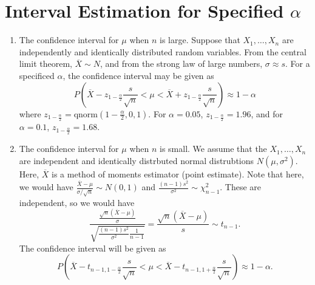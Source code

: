 \documentclass[15pt,a4paper]{book}
\theoremstyle{definition}
\begin{document}
\section{Interval Estimation for Specified $\alpha$}
\begin{enumerate}
    \item The confidence interval for $\mu$ when $n$ is large. Suppose that $X_{1},\ldots,X_{n}$ are independently and identically distributed random variables. From the central limit theorem, $\overline{X} \sim N$, and from the strong law of large numbers, $\sigma \approx s$. For a specificed $\alpha$, the confidence interval may be given as
    \begin{equation}
        P(\overline{X}-z_{1-\frac{\alpha}{2}} \frac{s}{\sqrt{n}} < \mu < \overline{X}+z_{1-\frac{\alpha}{2}} \frac{s}{\sqrt{n}}) \approx 1-\alpha
    \end{equation}
    where $z_{1-\frac{\alpha}{2}} = \text{qnorm}(1-\frac{\alpha}{2}, 0, 1)$. For $\alpha = 0.05$, $z_{1-\frac{\alpha}{2}} = 1.96$, and for $\alpha = 0.1$, $z_{1-\frac{\alpha}{2}} = 1.68$.
    
    \item The confidence interval for $\mu$ when $n$ is small. We assume that the $X_{1},\ldots,X_{n}$ are independent and identically distrbuted normal distrubtions $N(\mu,\sigma^{2})$. Here, $\overline{X}$ is a method of moments estimator (point estimate). Note that here, we would have $\frac{\overline{X}-\mu}{\sigma/\sqrt{n}} \sim N(0,1)$ and $\frac{(n-1)s^{2}}{\sigma^{2}} \sim \chi_{n-1}^{2}$. These are independent, so we would have
    \begin{equation}
        \dfrac{\frac{\sqrt{n} (\overline{X}-\mu)}{\sigma}}{\sqrt{\frac{(n-1)s^{2}}{\sigma^{2}} \frac{1}{n-1}}} = \frac{\sqrt{n}(\overline{X}-\mu)}{s} \sim t_{n-1}.
    \end{equation}
    The confidence interval will be given as
    \begin{equation}
        P(\overline{X}-t_{n-1,1-\frac{\alpha}{2}}\frac{s}{\sqrt{n}} < \mu < \overline{X}-t_{n-1,1+\frac{\alpha}{2}}\frac{s}{\sqrt{n}}) \approx 1 - \alpha.
    \end{equation}
\end{enumerate}

\end{document}
